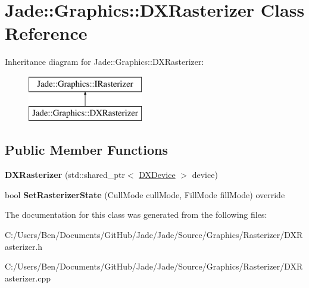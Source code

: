 \hypertarget{class_jade_1_1_graphics_1_1_d_x_rasterizer}{}\section{Jade\+:\+:Graphics\+:\+:D\+X\+Rasterizer Class Reference}
\label{class_jade_1_1_graphics_1_1_d_x_rasterizer}
Inheritance diagram for Jade\+:\+:Graphics\+:\+:D\+X\+Rasterizer\+:\begin{figure}[H]
\begin{center}
\leavevmode
\includegraphics[height=2.000000cm]{class_jade_1_1_graphics_1_1_d_x_rasterizer}
\end{center}
\end{figure}
\subsection*{Public Member Functions}
\begin{DoxyCompactItemize}
\item 
\hypertarget{class_jade_1_1_graphics_1_1_d_x_rasterizer_aabb158c02834c7c94e7054d090c9df7b}{}{\bfseries D\+X\+Rasterizer} (std\+::shared\+\_\+ptr$<$ \hyperlink{class_jade_1_1_graphics_1_1_d_x_device}{D\+X\+Device} $>$ device)\label{class_jade_1_1_graphics_1_1_d_x_rasterizer_aabb158c02834c7c94e7054d090c9df7b}

\item 
\hypertarget{class_jade_1_1_graphics_1_1_d_x_rasterizer_aaadd43907c9b262994ba2095de04e741}{}bool {\bfseries Set\+Rasterizer\+State} (Cull\+Mode cull\+Mode, Fill\+Mode fill\+Mode) override\label{class_jade_1_1_graphics_1_1_d_x_rasterizer_aaadd43907c9b262994ba2095de04e741}

\end{DoxyCompactItemize}


The documentation for this class was generated from the following files\+:\begin{DoxyCompactItemize}
\item 
C\+:/\+Users/\+Ben/\+Documents/\+Git\+Hub/\+Jade/\+Jade/\+Source/\+Graphics/\+Rasterizer/D\+X\+Rasterizer.\+h\item 
C\+:/\+Users/\+Ben/\+Documents/\+Git\+Hub/\+Jade/\+Jade/\+Source/\+Graphics/\+Rasterizer/D\+X\+Rasterizer.\+cpp\end{DoxyCompactItemize}
